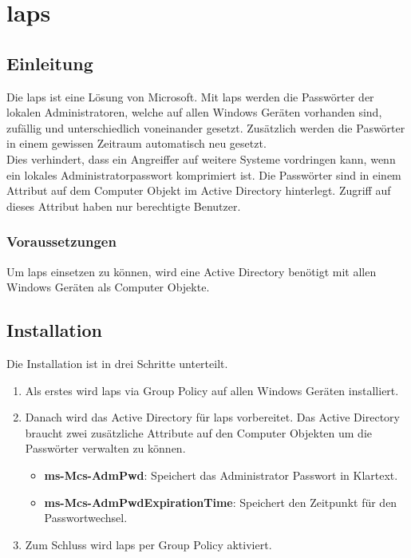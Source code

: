 \chapter{\acrfull{laps}}
\section{Einleitung}
Die \acrfull{laps} ist eine Lösung von Microsoft.
Mit \acrshort{laps} werden die Passwörter der lokalen Administratoren, welche auf allen Windows Geräten vorhanden sind, zufällig und unterschiedlich voneinander gesetzt.
Zusätzlich werden die Paswörter in einem gewissen Zeitraum automatisch neu gesetzt.\\

Dies verhindert, dass ein Angreiffer auf weitere Systeme vordringen kann, wenn ein lokales Administratorpasswort komprimiert ist.
Die Passwörter sind in einem Attribut auf dem Computer Objekt im Active Directory hinterlegt.
Zugriff auf dieses Attribut haben nur berechtigte Benutzer.

\subsection{Voraussetzungen}
Um \acrshort{laps} einsetzen zu können, wird eine Active Directory benötigt mit allen Windows Geräten als Computer Objekte.

\section{Installation}
Die Installation ist in drei Schritte unterteilt.
\begin{enumerate}
    \item Als erstes wird \acrshort{laps} via Group Policy auf allen Windows Geräten installiert.
    \item Danach wird das Active Directory für \acrshort{laps} vorbereitet. Das Active Directory braucht zwei zusätzliche Attribute auf den Computer Objekten um die Passwörter verwalten zu können.
          \begin{itemize}
              \item \textbf{ms-Mcs-AdmPwd}: Speichert das Administrator Passwort in Klartext.
              \item \textbf{ms-Mcs-AdmPwdExpirationTime}: Speichert den Zeitpunkt für den Passwortwechsel.
          \end{itemize}
    \item Zum Schluss wird \acrshort{laps} per Group Policy aktiviert.
\end{enumerate}

